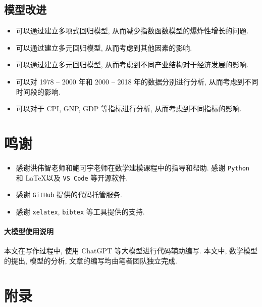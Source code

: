 \documentclass{article}
\begin{document}
\subsection{模型改进}

\begin{itemize}
  \item 可以通过建立多项式回归模型, 从而减少指数函数模型的爆炸性增长的问题.
  \item 可以通过建立多元回归模型, 从而考虑到其他因素的影响.
  \item 可以通过建立多元回归模型, 从而考虑到不同产业结构对于经济发展的影响.
  \item 可以对 1978 -- 2000 年和 2000 -- 2018 年的数据分别进行分析, 从而考虑到不同时间段的影响.
  \item 可以对于 CPI, GNP, GDP 等指标进行分析, 从而考虑到不同指标的影响.
\end{itemize}

\section*{鸣谢}

\begin{itemize}
    \item 感谢洪伟智老师和鲍可宇老师在数学建模课程中的指导和帮助. 感谢 \texttt{Python} 和 \LaTeX 以及 \texttt{VS Code} 等开源软件.
    \item 感谢 \texttt{GitHub} 提供的代码托管服务.
    \item 感谢 \texttt{xelatex}, \texttt{bibtex} 等工具提供的支持.
\end{itemize}

\paragraph{大模型使用说明} 本文在写作过程中, 使用 ChatGPT 等大模型进行代码辅助编写. 本文中, 数学模型的提出, 模型的分析, 文章的编写均由笔者团队独立完成.

{}


\nocite{*}

\section*{附录}
\end{document}

